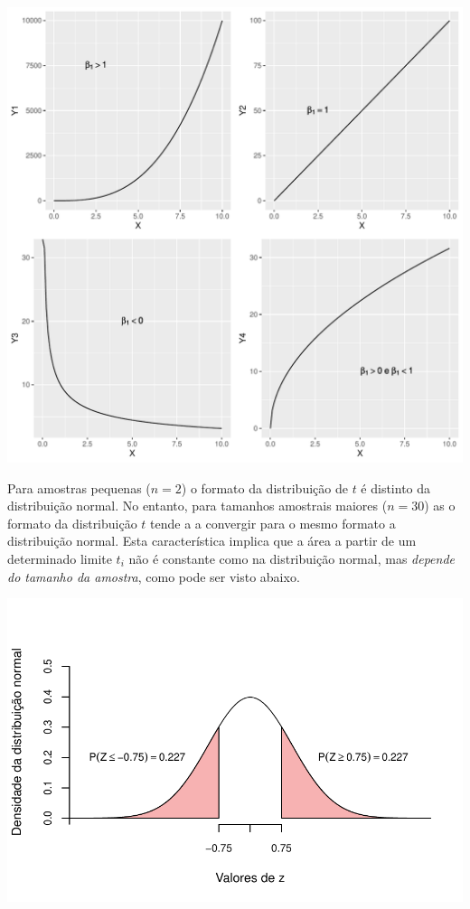 \documentclass[
]{book}
\begin{document}
\includegraphics{probest-cambientais_files/figure-latex/unnamed-chunk-120-1.pdf}

Para amostras pequenas (\(n = 2\)) o formato da distribuição de \(t\) é distinto da distribuição normal. No entanto, para tamanhos amostrais maiores (\(n = 30\)) as o formato da distribuição \(t\) tende a a convergir para o mesmo formato a distribuição normal. Esta característica implica que a área a partir de um determinado limite \(t_i\) não é constante como na distribuição normal, mas \emph{depende do tamanho da amostra}, como pode ser visto abaixo.

\begin{center}\includegraphics{probest-cambientais_files/figure-latex/unnamed-chunk-121-1} \end{center}
\end{document}
